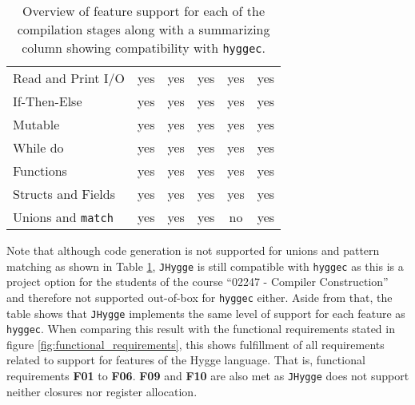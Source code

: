 \begin{table}[H]
\begin{tabular}{lccccc}
Read and Print I/O           & yes                                & yes                              & yes                                & yes                                & yes                                                              \\
If-Then-Else                 & yes                                & yes                              & yes                                & yes                                & yes                                                              \\
Mutable                      & yes                                & yes                              & yes                                & yes                                & yes                                                              \\
While do                     & yes                                & yes                              & yes                                & yes                                & yes                                                              \\
Functions                    & yes                                & yes                              & yes                                & yes                                & yes                                                              \\  
Structs and Fields & yes                                & yes                              & yes                                & yes           & yes                                         \\ 
Unions and \texttt{match}  & yes                                & yes                              & yes                                & no                                 & yes                                                             
\end{tabular}
\caption{Overview of feature support for each of the compilation stages along with a summarizing column showing compatibility with \texttt{hyggec}.}
\label{table:requirements_fulfillment}
\end{table}

Note that although code generation is not supported for unions and pattern matching as shown in Table \ref{table:requirements_fulfillment}, \texttt{JHygge} is still compatible with \texttt{hyggec}
as this is a project option for the students of the course ``02247 - Compiler Construction'' and therefore not supported out-of-box for \texttt{hyggec}
either. Aside from that, the table shows that \texttt{JHygge} implements the same level of support for each feature as \texttt{hyggec}.
When comparing this result with the functional requirements stated in figure \ref{fig:functional_requirements}, this shows fulfillment of all requirements related to support for features of the Hygge language. That is, functional requirements \textbf{F01} to \textbf{F06}. \textbf{F09} and \textbf{F10} are also met as \texttt{JHygge}
does not support neither closures nor register allocation.

